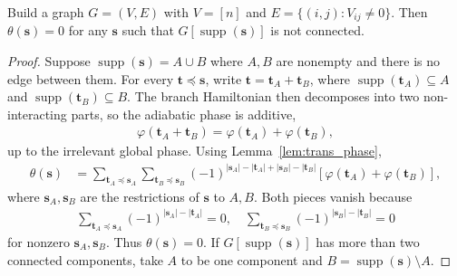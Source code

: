 \begin{lemma}
    Build a graph $G = (V,E)$ with $V = [n]$ and $E = \{(i,j): V_{ij} \neq 0\}$. Then $\theta(\mathbf{s}) = 0$ for any $\mathbf{s}$ such that $G[\operatorname{supp}(\mathbf{s})]$ is not connected. 
\end{lemma}
\begin{proof}
    Suppose $\operatorname{supp}(\mathbf{s})=A\cup B$ where $A,B$ are nonempty and there is no edge between them.
    For every $\mathbf{t}\preceq\mathbf{s}$, write $\mathbf{t}=\mathbf{t}_A+\mathbf{t}_B$, where $\operatorname{supp}(\mathbf{t}_A)\subseteq A$ and $\operatorname{supp}(\mathbf{t}_B)\subseteq B$.
    The branch Hamiltonian then decomposes into two non-interacting parts, so the adiabatic phase is additive,
    \begin{align}
        \varphi(\mathbf{t}_A+\mathbf{t}_B)
        = \varphi(\mathbf{t}_A) + \varphi(\mathbf{t}_B),
    \end{align}
    up to the irrelevant global phase. Using Lemma~\ref{lem:trans_phase},
    \begin{align}
        \theta(\mathbf{s})
        &= \sum_{\mathbf{t}_A\preceq \mathbf{s}_A}\sum_{\mathbf{t}_B\preceq \mathbf{s}_B}
        (-1)^{|\mathbf{s}_A|-|\mathbf{t}_A|+|\mathbf{s}_B|-|\mathbf{t}_B|}
        \left[\varphi(\mathbf{t}_A)+\varphi(\mathbf{t}_B)\right],
    \end{align}
    where $\mathbf{s}_A,\mathbf{s}_B$ are the restrictions of $\mathbf{s}$ to $A,B$.
    Both pieces vanish because
    \begin{align}
        \sum_{\mathbf{t}_A\preceq \mathbf{s}_A}(-1)^{|\mathbf{s}_A|-|\mathbf{t}_A|}=0,\quad
        \sum_{\mathbf{t}_B\preceq \mathbf{s}_B}(-1)^{|\mathbf{s}_B|-|\mathbf{t}_B|}=0
    \end{align}
    for nonzero $\mathbf{s}_A,\mathbf{s}_B$.
    Thus $\theta(\mathbf{s})=0$. If $G[\operatorname{supp}(\mathbf{s})]$ has more than two connected components, take $A$ to be one component and $B=\operatorname{supp}(\mathbf{s})\setminus A$.
\end{proof}
